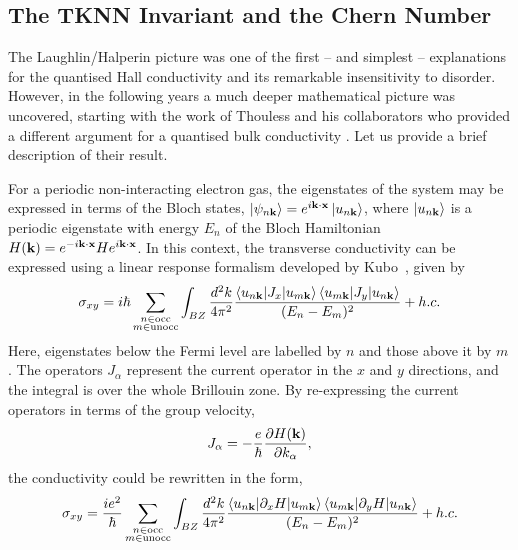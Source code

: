 \subsection{The TKNN Invariant and the Chern Number} \label{sec:TKNN}

The Laughlin/Halperin picture was one of the first -- and simplest -- explanations for the quantised Hall conductivity and its remarkable insensitivity to disorder. However, in the following years a much deeper mathematical picture was uncovered, starting with the work of Thouless and his collaborators who provided a different argument for a quantised bulk conductivity \cite{thouless_quantized_1982}. Let us provide a brief description of their result. 

For a periodic non-interacting electron gas, the eigenstates of the system may be expressed in terms of the Bloch states, $\ket {\psi_{n\textbf k}} = e^{i \textbf k\cdot \textbf x} \ket {u_{n\textbf k}}$, where $ \ket {u_{n\textbf k}}$ is a periodic eigenstate with energy $E_n$ of the Bloch Hamiltonian $H(\textbf k) = e^{-i \textbf k\cdot \textbf x} H e^{i \textbf k\cdot \textbf x}$. In this context, the transverse conductivity can be expressed using a linear response formalism developed by Kubo~\cite{kubo_statistical-mechanical_1957}, given by
\begin{align}
    \sigma_{xy} = i \hbar \sum_{
        \substack{n \in \textup{occ} \\ 
            m \in \textup{unocc}}
        }
        \int_{BZ} \frac{d^2k}{4\pi^2}
        \frac{
            \braket{u_{n\textbf k}| J_x | u_{m\textbf k}}
            \braket{u_{m\textbf k}| J_y | u_{n\textbf k}}
        }{(E_n - E_m)^2} + h.c.
\end{align}
Here, eigenstates below the Fermi level are labelled by $n$ and those above it by $m$. The operators $J_\alpha$ represent the current operator in the $x$ and $y$ directions, and the integral is over the whole Brillouin zone. By re-expressing the current operators in terms of the group velocity,
\begin{align}
    J_\alpha = -\frac e\hbar \frac{\partial H(\textbf k)}{\partial k_\alpha},
\end{align}
the conductivity could be rewritten in the form,
\begin{align}
    \sigma_{xy} =  \frac{ie^2}\hbar \sum_{
        \substack{n \in \textup{occ} \\ 
            m \in \textup{unocc}}
        }
        \int_{BZ} \frac{d^2k}{4\pi^2}
        \frac{
            \braket{u_{n\textbf k}| \partial_x H | u_{m\textbf k}}
            \braket{u_{m\textbf k}| \partial_y H | u_{n\textbf k}}
        }{(E_n - E_m)^2} + h.c. 
\end{align}
